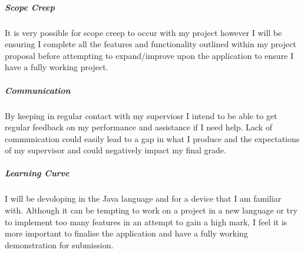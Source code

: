 \subparagraph{Scope Creep}\label{scope-creep}

It is very possible for scope creep to occur with my project however I
will be ensuring I complete all the features and functionality outlined
within my project proposal before attempting to expand/improve upon the
application to ensure I have a fully working project.

\subparagraph{Communication}\label{communication}

By keeping in regular contact with my superviosr I intend to be able to
get regular feedback on my performance and assistance if I need help.
Lack of communication could easily lead to a gap in what I produce and
the expectations of my supervisor and could negatively impact my final
grade.

\subparagraph{Learning Curve}\label{learning-curve}

I will be devoloping in the Java language and for a device that I am
familiar with. Although it can be tempting to work on a project in a new
language or try to implement too many features in an attempt to gain a
high mark, I feel it is more important to finalise the application and
have a fully working demonstration for submission.
